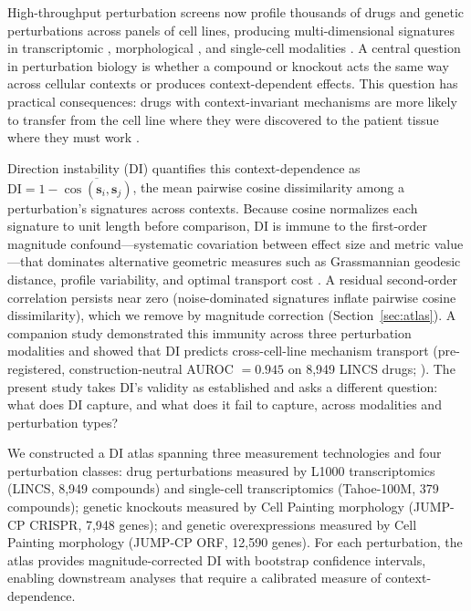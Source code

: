 \documentclass[11pt]{article}
\begin{document}
High-throughput perturbation screens now profile thousands of drugs and
genetic perturbations across panels of cell lines, producing
multi-dimensional signatures in transcriptomic
\citep{subramanian2017next}, morphological \citep{bray2016cell}, and
single-cell modalities \citep{tahoe2025}.  A central question in
perturbation biology is whether a compound or knockout acts the same way
across cellular contexts or produces context-dependent effects.  This
question has practical consequences: drugs with context-invariant
mechanisms are more likely to transfer from the cell line where they were
discovered to the patient tissue where they must work
\citep{tower2026confound}.

Direction instability (DI) quantifies this context-dependence as
$\mathrm{DI} = 1 - \overline{\cos(\mathbf{s}_i, \mathbf{s}_j)}$, the
mean pairwise cosine dissimilarity among a perturbation's signatures
across contexts.  Because cosine normalizes each signature to unit
length before comparison, DI is immune to the first-order magnitude
confound---systematic covariation between effect size and metric
value---that dominates alternative geometric measures such as
Grassmannian geodesic distance, profile variability, and optimal
transport cost \citep{tower2026confound}.  A residual second-order
correlation persists near zero (noise-dominated signatures inflate
pairwise cosine dissimilarity), which we remove by magnitude correction
(Section~\ref{sec:atlas}).  A companion study demonstrated this immunity
across three perturbation modalities and showed that DI predicts
cross-cell-line mechanism transport (pre-registered, construction-neutral
AUROC $= 0.945$ on 8{,}949 LINCS drugs; \citealp{tower2026confound}).
The present study takes DI's validity as established and asks a
different question: what does DI capture, and what does it fail to
capture, across modalities and perturbation types?

We constructed a DI atlas spanning three measurement technologies and
four perturbation classes: drug perturbations measured by L1000
transcriptomics (LINCS, 8{,}949 compounds) and single-cell
transcriptomics (Tahoe-100M, 379 compounds); genetic knockouts measured
by Cell Painting morphology (JUMP-CP CRISPR, 7{,}948 genes); and
genetic overexpressions measured by Cell Painting morphology (JUMP-CP
ORF, 12{,}590 genes).  For each perturbation, the atlas provides
magnitude-corrected DI with bootstrap confidence intervals, enabling
downstream analyses that require a calibrated measure of
context-dependence.
\end{document}
